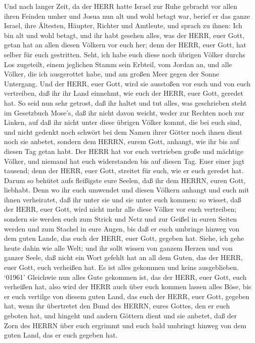  Und nach langer Zeit, da der HERR hatte Israel zur Ruhe
gebracht vor allen ihren Feinden umher und Josua nun alt und wohl betagt
war,  berief er das ganze Israel, ihre Ältesten, Häupter,
Richter und Amtleute, und sprach zu ihnen: Ich bin alt und wohl betagt,
 und ihr habt gesehen alles, was der HERR, euer Gott, getan
hat an allen diesen Völkern vor euch her; denn der HERR, euer Gott, hat
selber für euch gestritten.  Seht, ich habe euch diese noch
übrigen Völker durchs Los zugeteilt, einem jeglichen Stamm sein Erbteil,
vom Jordan an, und alle Völker, die ich ausgerottet habe, und am großen
Meer gegen der Sonne Untergang.  Und der HERR, euer Gott,
wird sie ausstoßen vor euch und von euch vertreiben, daß ihr ihr Land
einnehmt, wie euch der HERR, euer Gott, geredet hat.  So
seid nun sehr getrost, daß ihr haltet und tut alles, was geschrieben
steht im Gesetzbuch Mose's, daß ihr nicht davon weicht, weder zur
Rechten noch zur Linken,  auf daß ihr nicht unter diese
übrigen Völker kommt, die bei euch sind, und nicht gedenkt noch schwört
bei dem Namen ihrer Götter noch ihnen dient noch sie anbetet,
 sondern dem HERRN, eurem Gott, anhangt, wie ihr bis auf
diesen Tag getan habt.  Der HERR hat vor euch vertrieben
große und mächtige Völker, und niemand hat euch widerstanden bis auf
diesen Tag.  Euer einer jagt tausend; denn der HERR, euer
Gott, streitet für euch, wie er euch geredet hat.  Darum so
behütet aufs fleißigste eure Seelen, daß ihr dem HERRN, euren Gott,
liebhabt.  Denn wo ihr euch umwendet und diesen Völkern
anhangt und euch mit ihnen verheiratet, daß ihr unter sie und sie unter
euch kommen:  so wisset, daß der HERR, euer Gott, wird
nicht mehr alle diese Völker vor euch vertreiben; sondern sie werden
euch zum Strick und Netz und zur Geißel in euren Seiten werden und zum
Stachel in eure Augen, bis daß er euch umbringe hinweg von dem guten
Lande, das euch der HERR, euer Gott, gegeben hat.  Siehe,
ich gehe heute dahin wie alle Welt; und ihr sollt wissen von ganzem
Herzen und von ganzer Seele, daß nicht ein Wort gefehlt hat an all dem
Guten, das der HERR, euer Gott, euch verheißen hat. Es ist alles
gekommen und keins ausgeblieben.  `01961' Gleichwie nun
alles Gute gekommen ist, das der HERR, euer Gott, euch verheißen hat,
also wird der HERR auch über euch kommen lassen alles Böse, bis er euch
vertilge von diesem guten Land, das euch der HERR, euer Gott, gegeben
hat,  wenn ihr übertretet den Bund des HERRN, eures Gottes,
den er euch geboten hat, und hingeht und andern Göttern dient und sie
anbetet, daß der Zorn des HERRN über euch ergrimmt und euch bald
umbringt hinweg von dem guten Land, das er euch gegeben hat.

